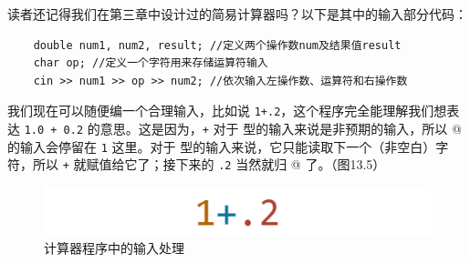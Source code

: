 读者还记得我们在第三章中设计过的简易计算器吗？以下是其中的输入部分代码：
\begin{lstlisting}
    double num1, num2, result; //定义两个操作数num及结果值result
    char op; //定义一个字符用来存储运算符输入
    cin >> num1 >> op >> num2; //依次输入左操作数、运算符和右操作数
\end{lstlisting}
我们现在可以随便编一个合理输入，比如说 \texttt{1+.2}，这个程序完全能理解我们想表达 \texttt{1.0 + 0.2} 的意思。这是因为，\texttt{+} 对于 \lstinline@double@ 型的输入来说是非预期的输入，所以 @ 的输入会停留在 \texttt{1} 这里。对于 \lstinline@char@ 型的输入来说，它只能读取下一个（非空白）字符，所以 \texttt{+} 就赋值给它了；接下来的 \texttt{.2} 当然就归 @ 了。（图13.5）\par
\begin{figure}[htbp]
    \centering
    \includegraphics[width=.4\textwidth]{../images/generalized_parts/13_input_for_calculator.drawio.png}
    \caption{计算器程序中的输入处理}
\end{figure}
